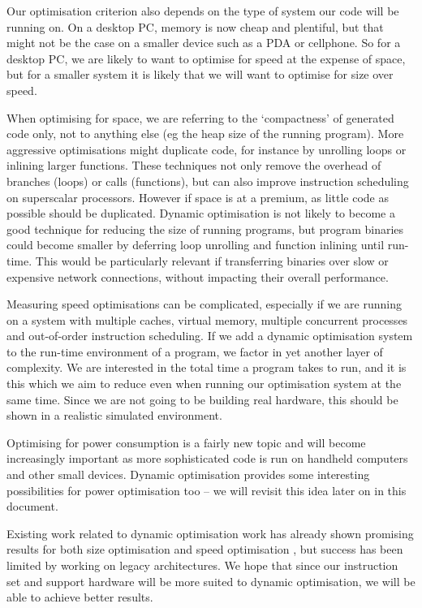 \documentclass[11pt,letterpaper,onecolumn,notitlepage]{article}
\begin{document}
Our optimisation criterion also depends on the type of system our code will be running on. On a desktop PC, memory is now cheap and plentiful, but that might not be the case on a smaller device such as a PDA or cellphone. So for a desktop PC, we are likely to want to optimise for speed at the expense of space, but for a smaller system it is likely that we will want to optimise for size over speed.

When optimising for space, we are referring to the `compactness' of generated code only, not to anything else (eg the heap size of the running program). More aggressive optimisations might duplicate code, for instance by unrolling loops or inlining larger functions. These techniques not only remove the overhead of branches (loops) or calls (functions), but can also improve instruction scheduling on superscalar processors. However if space is at a premium, as little code as possible should be duplicated. Dynamic optimisation is not likely to become a good technique for reducing the size of running programs, but program binaries could become smaller by deferring loop unrolling and function inlining until run-time. This would be particularly relevant if transferring binaries over slow or expensive network connections, without impacting their overall performance.

Measuring speed optimisations can be complicated, especially if we are running on a system with multiple caches, virtual memory, multiple concurrent processes and out-of-order instruction scheduling. If we add a dynamic optimisation system to the run-time environment of a program, we factor in yet another layer of complexity. We are interested in the total time a program takes to run, and it is this which we aim to reduce even when running our optimisation system at the same time. Since we are not going to be building real hardware, this should be shown in a realistic simulated environment.

Optimising for power consumption is a fairly new topic and will become increasingly important as more sophisticated code is run on handheld computers and other small devices. Dynamic optimisation provides some interesting possibilities for power optimisation too -- we will revisit this idea later on in this document.

Existing work related to dynamic optimisation work has already shown promising results for both size optimisation \cite{AdaptCtxInline} and speed optimisation \cite{Deco,Dynamo,WigginsRedstone,Mojo}, but success has been limited by working on legacy architectures. We hope that since our instruction set and support hardware will be more suited to dynamic optimisation, we will be able to achieve better results.
\end{document}

